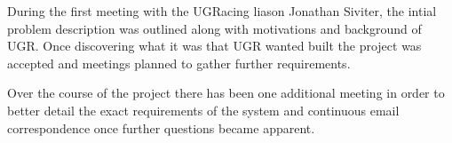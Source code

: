 During the first meeting with the UGRacing liason Jonathan Siviter, the intial problem description was outlined along with motivations and background of UGR. Once discovering what it was that UGR wanted built the project was accepted and meetings planned to gather further requirements. 


Over the course of the project there has been one additional meeting in order to better detail the exact requirements of the system and continuous email correspondence once further questions became apparent.
